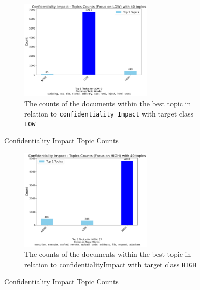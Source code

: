 \documentclass[12pt]{article}
\begin{document}
\begin{figure}[h!]
	\ContinuedFloat
	\centering
	\begin{subfigure}{\textwidth}
		\centering
		\includegraphics[width=0.7\textwidth]{figures/confidentialityImpact/merged_top_k_topics_category_focus_counts_confidentialityImpact_LOW_k1.pdf}
		\caption{The counts of the documents within the best topic in relation to \texttt{confidentiality Impact} with target class \texttt{LOW}}
		\label{fig:confidentialityImpact_60_LOW}
	\end{subfigure}

	\caption{Confidentiality Impact Topic Counts}
\end{figure}

\begin{figure}[h!]
	\ContinuedFloat
	\centering
	\begin{subfigure}{\textwidth}
		\centering
		\includegraphics[width=0.7\textwidth]{figures/confidentialityImpact/merged_top_k_topics_category_focus_counts_confidentialityImpact_HIGH_k1.pdf}
		\caption{The counts of the documents within the best topic in relation to confidentialityImpact with target class \texttt{HIGH}}
		\label{fig:confidentialityImpact_60_HIGH}
	\end{subfigure}

	\caption{Confidentiality Impact Topic Counts}
\end{figure}
\end{document}
